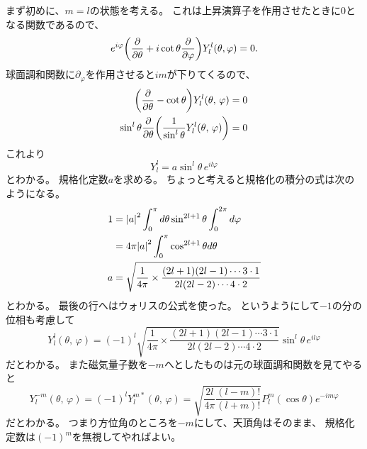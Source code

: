 \documentclass[../../master.tex]{subfiles}
\begin{document}
まず初めに、\(m=l\)の状態を考える。
これは上昇演算子を作用させたときに\(0\)となる関数であるので、
\begin{equation}
	e^{i\varphi}\qty(\pdv{\theta}+i\cot\theta\pdv{\varphi})Y_l^l(\theta,\varphi)=0.
\end{equation}
球面調和関数に\(\partial_\varphi\)を作用させると\(im\)が下りてくるので、
\begin{align}
	\qty(\pdv{\theta} - \cot\theta) Y_l^l(\theta,\,\varphi) = 0 \\
	\sin^l\theta\pdv{\theta}\qty(\frac{1}{\sin^l \theta}Y_l^l(\theta,\,\varphi))=0
\end{align}
これより
\begin{equation}
	Y_l^l =a \sin^l\theta\, e^{il\varphi}
\end{equation}
とわかる。
規格化定数\(a\)を求める。
ちょっと考えると規格化の積分の式は次のようになる。
\begin{align}
	1 & = \abs{a}^2 \int_{0}^{\pi} d\theta \sin^{2l+1}\theta \int_{0}^{2\pi} d\varphi              \\
	  & = 4\pi \abs{a}^2 \int_{0}^{\pi} \cos^{2l+1}\theta d\theta                                 \\
	a & = \sqrt{\frac{1}{4\pi}\times\frac{(2l+1)(2l-1)\cdots 3\cdot 1}{2l(2l-2) \cdots 4\cdot 2}}
\end{align}
とわかる。
最後の行へはウォリスの公式を使った。
というようにして\(-1\)の分の位相も考慮して
\begin{equation}
	Y_l^l(\theta,\,\varphi)
	= (-1)^l\sqrt{\frac{1}{4\pi}\times\frac{(2l+1)(2l-1)\cdots 3\cdot 1}{2l(2l-2) \cdots 4\cdot 2}}
	\sin^l \theta \, e^{il\varphi}
\end{equation}
だとわかる。
また磁気量子数を\(-m\)へとしたものは元の球面調和関数を見てやると
\begin{equation}
	Y_l^{-m}(\theta,\,\varphi) = (-1)^l Y_l^{m*}(\theta,\,\varphi)
	= \sqrt{\frac{2l}{4\pi}\frac{(l-m)!}{(l+m)!}}P_l^m(\cos\theta)e^{-im\varphi}
\end{equation}
だとわかる。
つまり方位角のところを\(-m\)にして、天頂角はそのまま、
規格化定数は\((-1)^m\)を無視してやればよい。
\end{document}
